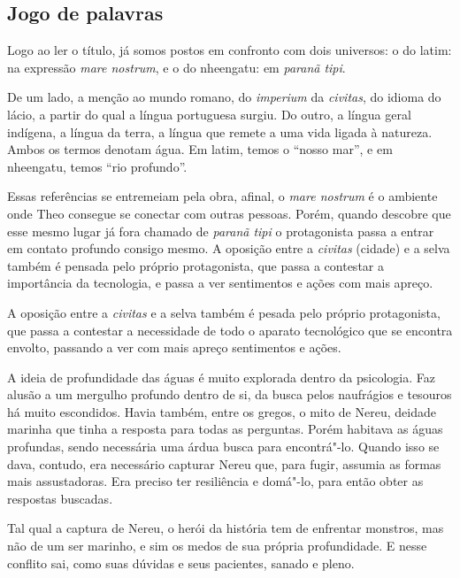 \documentclass[12pt]{extarticle}
\begin{document}
\subsection{Jogo de palavras}

Logo ao ler o título, já somos postos em confronto com dois universos: o do
latim: na expressão  \emph{mare nostrum}, e o do nheengatu: em  \emph{paranã tipi}.

De um lado, a menção ao mundo romano, do \emph{imperium} da \emph{civitas}, do idioma do
lácio, a partir do qual a língua portuguesa surgiu.
Do outro, a língua geral indígena, a língua da terra, a língua que remete a
uma vida ligada à natureza. Ambos os termos denotam água. Em latim, temos 
o “nosso mar”, e em nheengatu, temos “rio profundo”.

Essas referências se entremeiam pela obra, afinal, o \emph{mare nostrum} é o
ambiente onde Theo consegue se conectar com outras pessoas.
Porém, quando descobre que esse mesmo lugar já fora chamado de \emph{paranã tipi}  o
protagonista passa a entrar em contato profundo consigo mesmo.
A oposição entre a \textit{civitas} (cidade) e a selva também é pensada pelo próprio
protagonista, que passa a contestar a importância da tecnologia, e passa a
ver sentimentos e ações com mais apreço.


A oposição entre a \emph{civitas} e a selva também é pesada pelo próprio
protagonista, que passa a contestar a necessidade de todo o aparato
tecnológico que se encontra envolto, passando a ver com mais apreço
sentimentos e ações.

A ideia de profundidade das águas é muito explorada dentro da
psicologia. Faz alusão a um mergulho profundo dentro de si, da busca
pelos naufrágios e tesouros há muito escondidos. Havia também, entre os
gregos, o mito de Nereu, deidade marinha que tinha a resposta para todas
as perguntas. Porém habitava as águas profundas, sendo necessária uma
árdua busca para encontrá"-lo. Quando isso se dava, contudo, era
necessário capturar Nereu que, para fugir, assumia as formas mais
assustadoras. Era preciso ter resiliência e domá"-lo, para então obter as
respostas buscadas.

Tal qual a captura de Nereu, o herói da história tem de enfrentar
monstros, mas não de um ser marinho, e sim os medos de sua
própria profundidade. E nesse conflito sai, como suas dúvidas e seus pacientes, sanado e pleno.
\end{document}
